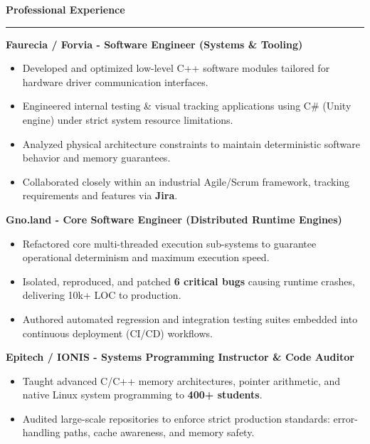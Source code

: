 \documentclass[9pt]{extarticle}
\begin{document}
\par\vspace{5pt}

{\large\bfseries Professional Experience}
\par\vspace{-8pt}
\rule{\linewidth}{0.4pt}
\par\vspace{5pt}

{\bfseries Faurecia / Forvia - Software Engineer (Systems \& Tooling)}
\begin{itemize}[noitemsep, topsep=0pt]
    \item Developed and optimized low-level C++ software modules tailored for hardware driver communication interfaces.
    \item Engineered internal testing \& visual tracking applications using C\# (Unity engine) under strict system resource limitations.
    \item Analyzed physical architecture constraints to maintain deterministic software behavior and memory guarantees.
    \item Collaborated closely within an industrial Agile/Scrum framework, tracking requirements and features via {\bfseries Jira}.
\end{itemize}

\par\vspace{5pt}

{\bfseries Gno.land - Core Software Engineer (Distributed Runtime Engines)} %
\begin{itemize}[noitemsep, topsep=0pt]
    \item Refactored core multi-threaded execution sub-systems to guarantee operational determinism and maximum execution speed.
    \item Isolated, reproduced, and patched {\bfseries 6 critical bugs} causing runtime crashes, delivering 10k+ LOC to production. %
    \item Authored automated regression and integration testing suites embedded into continuous deployment (CI/CD) workflows.
\end{itemize}

\par\vspace{5pt}

{\bfseries Epitech / IONIS - Systems Programming Instructor \& Code Auditor} %
\begin{itemize}[noitemsep, topsep=0pt]
    \item Taught advanced C/C++ memory architectures, pointer arithmetic, and native Linux system programming to {\bfseries 400+ students}. %
    \item Audited large-scale repositories to enforce strict production standards: error-handling paths, cache awareness, and memory safety.
\end{itemize}
\end{document}
